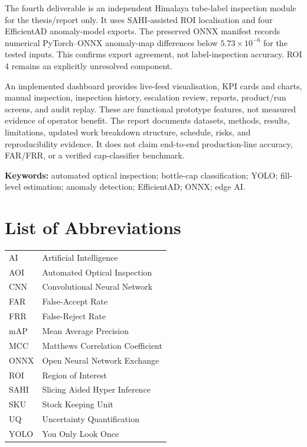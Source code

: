 \documentclass[12pt,a4paper]{report}
\begin{document}
The fourth deliverable is an independent Himalaya tube-label inspection module for the thesis/report only. It uses SAHI-assisted ROI localisation and four EfficientAD anomaly-model exports. The preserved ONNX manifest records numerical PyTorch--ONNX anomaly-map differences below $5.73\times10^{-6}$ for the tested inputs. This confirms export agreement, not label-inspection accuracy. ROI 4 remains an explicitly unresolved component.

An implemented dashboard provides live-feed visualisation, KPI cards and charts, manual inspection, inspection history, escalation review, reports, product/run screens, and audit replay. These are functional prototype features, not measured evidence of operator benefit. The report documents datasets, methods, results, limitations, updated work breakdown structure, schedule, risks, and reproducibility evidence. It does not claim end-to-end production-line accuracy, FAR/FRR, or a verified cap-classifier benchmark.

\noindent\textbf{Keywords:} automated optical inspection; bottle-cap classification; YOLO; fill-level estimation; anomaly detection; EfficientAD; ONNX; edge AI.

\tableofcontents\listoftables\listoffigures
\chapter*{List of Abbreviations}
\begin{longtable}{ll}AI & Artificial Intelligence\\AOI & Automated Optical Inspection\\CNN & Convolutional Neural Network\\FAR & False-Accept Rate\\FRR & False-Reject Rate\\mAP & Mean Average Precision\\MCC & Matthews Correlation Coefficient\\ONNX & Open Neural Network Exchange\\ROI & Region of Interest\\SAHI & Slicing Aided Hyper Inference\\SKU & Stock Keeping Unit\\UQ & Uncertainty Quantification\\YOLO & You Only Look Once\end{longtable}
\clearpage{}
\end{document}
